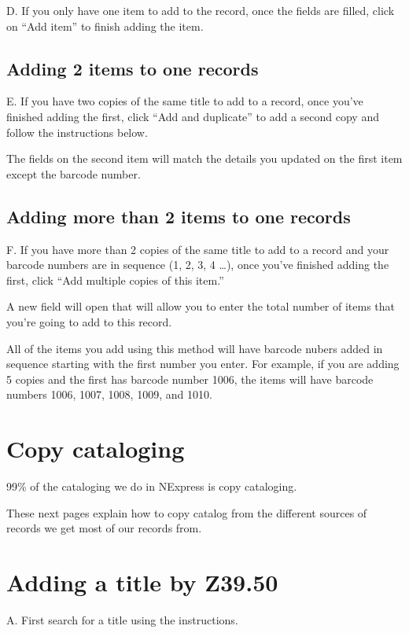 \documentclass[letterpaper,10pt,english]{sphinxmanual}
\begin{document}
D. If you only have one item to add to the record, once the fields are
filled, click on “Add item” to finish adding the item.


\section{Adding 2 items to one records}
\label{\detokenize{title-already-exists/adding-an-item:adding-2-items-to-one-records}}
E. If you have two copies of the same title to add to a record, once
you’ve finished adding the first, click “Add and duplicate” to add a
second copy and follow the instructions below.

The fields on the second item will match the details you updated on the
first item except the barcode number.


\section{Adding more than 2 items to one records}
\label{\detokenize{title-already-exists/adding-an-item:adding-more-than-2-items-to-one-records}}
F. If you have more than 2 copies of the same title to add to a record
and your barcode numbers are in sequence (1, 2, 3, 4 …), once you’ve
finished adding the first, click “Add multiple copies of this item.”

A new field will open that will allow you to enter the total number of
items that you’re going to add to this record.

All of the items you add using this method will have barcode nubers
added in sequence starting with the first number you enter. For example,
if you are adding 5 copies and the first has barcode number 1006, the
items will have barcode numbers 1006, 1007, 1008, 1009, and 1010.


\chapter{Copy cataloging}
\label{\detokenize{copy-cataloging/README:copy-cataloging}}\label{\detokenize{copy-cataloging/README::doc}}
99\% of the cataloging we do in NExpress is copy cataloging.

These next pages explain how to copy catalog from the different sources
of records we get most of our records from.


\chapter{Adding a title by Z39.50}
\label{\detokenize{copy-cataloging/adding-a-title-by-z39.50:adding-a-title-by-z39-50}}\label{\detokenize{copy-cataloging/adding-a-title-by-z39.50::doc}}
A. First search for a title using the  instructions.
\end{document}
